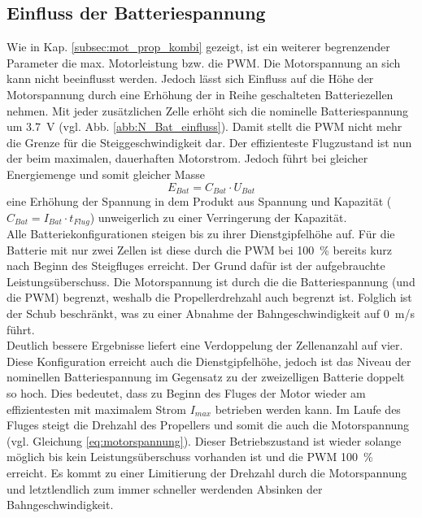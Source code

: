 \subsection{Einfluss der Batteriespannung}
\label{subsec:einfluss_n_bat}
Wie in Kap. \ref{subsec:mot_prop_kombi} gezeigt, ist ein weiterer begrenzender Parameter die max. Motorleistung bzw. die PWM. Die Motorspannung an sich kann nicht beeinflusst werden. Jedoch lässt sich Einfluss auf die Höhe der Motorspannung durch eine Erhöhung der in Reihe geschalteten Batteriezellen nehmen. Mit jeder zusätzlichen Zelle erhöht sich die nominelle Batteriespannung um \SI{3,7}{V} (vgl. Abb. \ref{abb:N_Bat_einfluss}). Damit stellt die PWM nicht mehr die Grenze für die Steiggeschwindigkeit dar. Der effizienteste Flugzustand ist nun der beim maximalen, dauerhaften Motorstrom. Jedoch führt bei gleicher Energiemenge und somit gleicher Masse 
\begin{equation}
	E_{Bat} = C_{Bat}\cdot U_{Bat}
\end{equation}
eine Erhöhung der Spannung in dem Produkt aus Spannung und Kapazität (\ensuremath{C_{Bat} = I_{Bat}\cdot t_{Flug}}) unweigerlich zu einer Verringerung der Kapazität.  \\
Alle Batteriekonfigurationen steigen bis zu ihrer Dienstgipfelhöhe auf. 
Für die Batterie mit nur zwei Zellen ist diese durch die PWM bei \SI{100}{\%} bereits kurz nach Beginn des Steigfluges erreicht. Der Grund dafür ist der aufgebrauchte Leistungsüberschuss. Die Motorspannung ist durch die die Batteriespannung (und die PWM) begrenzt, weshalb die Propellerdrehzahl auch begrenzt ist. Folglich ist der Schub beschränkt, was zu einer Abnahme der Bahngeschwindigkeit auf \SI{0}{m/s} führt. \\
Deutlich bessere Ergebnisse liefert eine Verdoppelung der Zellenanzahl auf vier. Diese Konfiguration erreicht auch die Dienstgipfelhöhe, jedoch ist das Niveau der nominellen Batteriespannung im Gegensatz zu der zweizelligen Batterie doppelt so hoch. Dies bedeutet, dass zu Beginn des Fluges der Motor wieder am effizientesten mit maximalem Strom \ensuremath{I_{max}} betrieben werden kann. Im Laufe des Fluges steigt die Drehzahl des Propellers und somit die auch die Motorspannung (vgl. Gleichung \ref{eq:motorspannung}). Dieser Betriebszustand ist wieder solange möglich bis kein Leistungsüberschuss vorhanden ist und die PWM \SI{100}{\%} erreicht. Es kommt zu einer Limitierung der Drehzahl durch die Motorspannung und letztlendlich zum immer schneller werdenden Absinken der Bahngeschwindigkeit. \\
